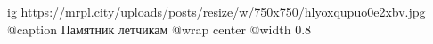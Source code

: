  
 
 
 
 

\ifcmt
  ig https://mrpl.city/uploads/posts/resize/w/750x750/hlyoxqupuo0e2xbv.jpg
	@caption Памятник летчикам
  @wrap center
  @width 0.8
\fi
